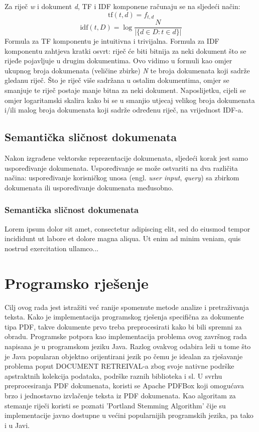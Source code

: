 \documentclass[times, utf8, zavrsni]{fer}
\begin{document}
Za riječ \textit{w} i dokument \textit{d}, TF i IDF komponene računaju se na sljedeći način:
\begin{equation}
{\displaystyle \mathrm {tf} (t,d)=f_{t,d}}
\end{equation}
\begin{equation}
{\displaystyle \mathrm {idf} (t,D)=\log {\frac {N}{|\{d\in D:t\in d\}|}}}
\end{equation}
Formula za TF komponentu je intuitivna i trivijalna. Formula za IDF komponentu zahtjeva kratki osvrt: riječ će biti bitnija za neki dokument što se rijeđe pojavljuje u drugim dokumentima. Ovo vidimo u formuli kao omjer ukupnog broja dokumenata (veličine zbirke) \textit{N} te broja dokumenata koji sadrže gledanu riječ. Što je riječ više sadržana u ostalim dokumentima, omjer se smanjuje te riječ postaje manje bitna za neki dokument. Naposlijetku, cijeli se omjer logaritamski skalira kako bi se u smanjio utjecaj velikog broja dokumenata i/ili malog broja dokumenata koji sadrže određenu riječ, na vrijednost IDF-a.

\section{Semantička sličnost dokumenata}
Nakon izgrađene vektorske reprezentacije dokumenata, sljedeći korak jest samo uspoređivanje dokumenata. Uspoređivanje se može ostvariti na dva različita načina: uspoređivanje korisničkog unosa (engl. \textit{user input}, \textit{query}) sa zbirkom dokumenata ili uspoređivanje dokumenata međusobno.

\subsection{Semantička sličnost dokumenata}
Lorem ipsum dolor sit amet, consectetur adipiscing elit, sed do 
eiusmod tempor incididunt ut labore et dolore magna aliqua. Ut 
enim ad minim veniam, quis nostrud exercitation ullamco...

\chapter{Programsko rješenje}
Cilj ovog rada jest istražiti već ranije spomenute metode analize i pretraživanja teksta.	Kako je implementacija programskog rješenja specifična za dokumente tipa PDF, takve dokumente prvo treba preprocesirati kako bi bili spremni za obradu.
Programske potpora kao implementacija problema ovog završnog rada napisana je u programskom jeziku Java. Razlog ovakvog odabira leži u tome što je Java popularan objektno orijentirani jezik po čemu je idealan za rješavanje problema poput DOCUMENT RETREIVAL-a zbog svoje nativne podrške apstraktnih kolekcija podataka, podrške raznih biblioteka i sl.
U svrhu preprocesiranja PDF dokumenata, koristi se Apache PDFBox koji omogućava brzo i jednostavno izvlačenje teksta iz PDF dokumenata.
Kao algoritam za stemanje riječi koristi se poznati 'Portland Stemming Algorithm' čije su implementacije javno dostupne u većini popularnijih programskih jezika, pa tako i u Javi.
\end{document}
